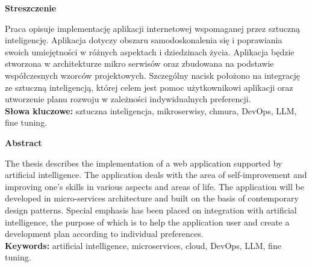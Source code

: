 \begin{center}
    {\bf\Large{Streszczenie}}\\
\end{center}
Praca opisuje implementację aplikacji internetowej wspomaganej przez sztuczną inteligencję. Aplikacja dotyczy obszaru samodoskonalenia się i poprawiania swoich umiejętności w różnych aspektach i dziedzinach życia. Aplikacja będzie stworzona w architekturze mikro serwisów oraz zbudowana na podstawie współczesnych wzorców projektowych.
Szczególny nacisk położono na integrację ze sztuczną inteligencją, której celem jest pomoc użytkownikowi aplikacji oraz utworzenie planu rozwoju w zależności indywidualnych preferencji.
\\
{\bf Słowa kluczowe:} sztuczna inteligencja, mikroserwisy, chmura, DevOps, LLM, fine tuning.
\clearpage

\begin{center}
    {\bf\Large{Abstract}}\\
\end{center}
The thesis describes the implementation of a web application supported by artificial intelligence. The application deals with the area of self-improvement and improving one's skills in various aspects and areas of life. The application will be developed in micro-services architecture and built on the basis of contemporary design patterns.
Special emphasis has been placed on integration with artificial intelligence, the purpose of which is to help the application user and create a development plan according to individual preferences.
\\
{\bf Keywords:} artificial intelligence, microservices, cloud, DevOps, LLM, fine tuning.


